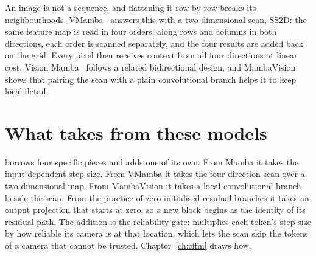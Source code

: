 An image is not a sequence, and flattening it row by row breaks its neighbourhoods. VMamba~\cite{liu2024vmamba}
answers this with a two-dimensional scan, SS2D: the same feature map is read in four orders, along rows and
columns in both directions, each order is scanned separately, and the four results are added back on the grid.
Every pixel then receives context from all four directions at linear cost. Vision Mamba~\cite{zhu2024vim} follows a
related bidirectional design, and MambaVision~\cite{hatamizadeh2025mambavision} shows that pairing the scan with a
plain convolutional branch helps it to keep local detail.


\section{What \method{} takes from these models}

\method{} borrows four specific pieces and adds one of its own. From Mamba it takes the input-dependent step size.
From VMamba it takes the four-direction scan over a two-dimensional map. From MambaVision it takes a local
convolutional branch beside the scan. From the practice of zero-initialised residual branches it takes an output
projection that starts at zero, so a new block begins as the identity of its residual path. The addition is the
reliability gate: \method{} multiplies each token's step size by how reliable its camera is at that location, which
lets the scan skip the tokens of a camera that cannot be trusted. Chapter~\ref{ch:cffm} draws how.
